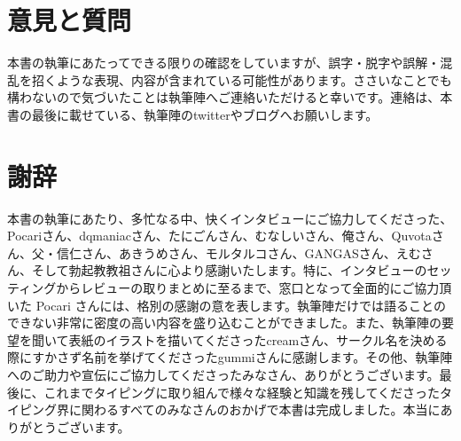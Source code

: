 \part*{意見と質問}
本書の執筆にあたってできる限りの確認をしていますが、誤字・脱字や誤解・混乱を招くような表現、内容が含まれている可能性があります。ささいなことでも構わないので気づいたことは執筆陣へご連絡いただけると幸いです。連絡は、本書の最後に載せている、執筆陣のtwitterやブログへお願いします。

\part*{謝辞}
本書の執筆にあたり、多忙なる中、快くインタビューにご協力してくださった、Pocariさん、dqmaniacさん、たにごんさん、むなしいさん、俺さん、Quvotaさん、父・信仁さん、あきうめさん、モルタルコさん、GANGASさん、えむさん、そして勃起教教祖さんに心より感謝いたします。特に、インタビューのセッティングからレビューの取りまとめに至るまで、窓口となって全面的にご協力頂いた Pocari さんには、格別の感謝の意を表します。執筆陣だけでは語ることのできない非常に密度の高い内容を盛り込むことができました。また、執筆陣の要望を聞いて表紙のイラストを描いてくださったcreamさん、サークル名を決める際にすかさず名前を挙げてくださったgummiさんに感謝します。その他、執筆陣へのご助力や宣伝にご協力してくださったみなさん、ありがとうございます。最後に、これまでタイピングに取り組んで様々な経験と知識を残してくださったタイピング界に関わるすべてのみなさんのおかげで本書は完成しました。本当にありがとうございます。

